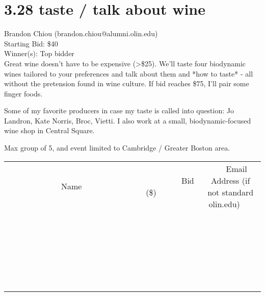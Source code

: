 \documentclass[11pt]{article}
\begin{document}
\section*{3.28 taste / talk about wine}
Brandon Chiou (brandon.chiou@alumni.olin.edu) \\
Starting Bid: \$40 \\
Winner(s): 
Top bidder \\
Great wine doesn't have to be expensive (\textgreater \$25). We'll taste four biodynamic wines tailored to your preferences and talk about them and *how to taste* - all without the pretension found in wine culture. If bid reaches \$75, I'll pair some finger foods.

Some of my favorite producers in case my taste is called into question: Jo Landron, Kate Norris, Broc, Vietti. I also work at a small, biodynamic-focused wine shop in Central Square.

Max group of 5, and event limited to Cambridge / Greater Boston area. \\[6ex]
\begin{tabular}{c c c}
~~~~~~~~~~~~~Name~~~~~~~~~~~~~ & ~~~~~~~~~Bid (\$)~~~~~~~~~ & ~~~Email Address (if not standard olin.edu)~~~ \\
 & & \\
\hline
 & & \\
\hline
 & & \\
\hline
 & & \\
\hline
 & & \\
\hline
 & & \\
\hline
 & & \\
\hline
 & & \\
\hline
 & & \\
\hline
 & & \\
\hline
 & & \\
\hline
 & & \\
\hline
 & & \\
\hline
 & & \\
\hline
 & & \\
\hline
 & & \\
\hline
 & & \\
\hline
 & & \\
\hline
 & & \\
\hline
 & & \\
\hline
 & & \\
\hline
 & & \\
\hline
 & & \\
\hline
 & & \\
\hline
 & & \\
\hline
 & & \\
\hline
\end{tabular}
\clearpage
\end{document}
